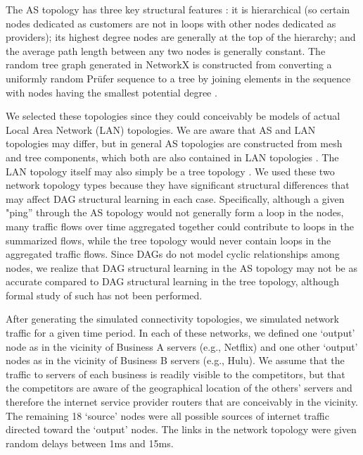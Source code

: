 \documentclass[conference]{IEEEtran}
\begin{document}
The AS topology has three key structural features \cite{b12}: it is hierarchical (so certain nodes dedicated as customers are not in loops with other nodes dedicated as providers); its highest degree nodes are generally at the top of the hierarchy; and the average path length between any two nodes is generally constant. The random tree graph generated in NetworkX is constructed from converting a uniformly random Prüfer sequence to a tree by joining elements in the sequence with nodes having the smallest potential degree \cite{b13}.

We selected these topologies since they could conceivably be models of actual Local Area Network (LAN) topologies. We are aware that AS and LAN topologies may differ, but in general AS topologies are constructed from mesh and tree components, which both are also contained in LAN topologies \cite{b14}. The LAN topology itself may also simply be a tree topology \cite{b14}. We used these two network topology types because they have significant structural differences that may affect DAG structural learning in each case. Specifically, although a given "ping” through the AS topology would not generally form a loop in the nodes, many traffic flows over time aggregated together could contribute to loops in the summarized flows, while the tree topology would never contain loops in the aggregated traffic flows. Since DAGs do not model cyclic relationships among nodes, we realize that DAG structural learning in the AS topology may not be as accurate compared to DAG structural learning in the tree topology, although formal study of such has not been performed.

After generating the simulated connectivity topologies, we simulated network traffic for a given time period. In each of these networks, we defined one ‘output' node as in the vicinity of Business A servers (e.g., Netflix) and one other ‘output' nodes as in the vicinity of Business B servers (e.g., Hulu). We assume that the traffic to servers of each business is readily visible to the competitors, but that the competitors are aware of the geographical location of the others' servers and therefore the internet service provider routers that are conceivably in the vicinity. The remaining 18 ‘source' nodes were all possible sources of internet traffic directed toward the ‘output' nodes. The links in the network topology were given random delays between 1ms and 15ms.
\end{document}
